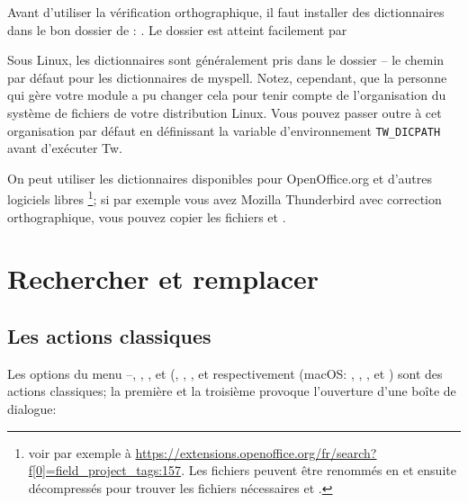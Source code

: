 Avant d'utiliser la vérification orthographique, il faut installer des dictionnaires dans le bon dossier de \Tw: . Le dossier  est atteint facilement par  \submenu{}

\begin{OSLinux}
Sous Linux, les dictionnaires sont généralement pris dans le dossier  -- le chemin par défaut pour les dictionnaires de myspell. Notez, cependant, que la personne qui gère votre module \Tw{} a pu changer cela pour tenir compte de l'organisation du système de fichiers de votre distribution Linux. Vous pouvez passer outre à cet organisation par défaut en définissant la variable d'environnement \verb+TW_DICPATH+ avant d'exécuter Tw.
\end{OSLinux}

On peut utiliser les dictionnaires disponibles pour OpenOffice.org et d'autres logiciels libres \footnote{voir par exemple à \url{https://extensions.openoffice.org/fr/search?f[0]=field_project_tags:157}. Les fichiers  peuvent être renommés en  et ensuite décompressés pour trouver les fichiers nécessaires  et .}; si par exemple vous avez Mozilla Thunderbird avec correction orthographique, vous pouvez copier les fichiers  et .

\section{Rechercher et remplacer}


\subsection{Les actions classiques}

Les options du menu --, , ,  et  (, , ,  et  respectivement (macOS: , , ,  et ) sont des actions classiques; la première et la troisième provoque l'ouverture d'une boîte de dialogue:

